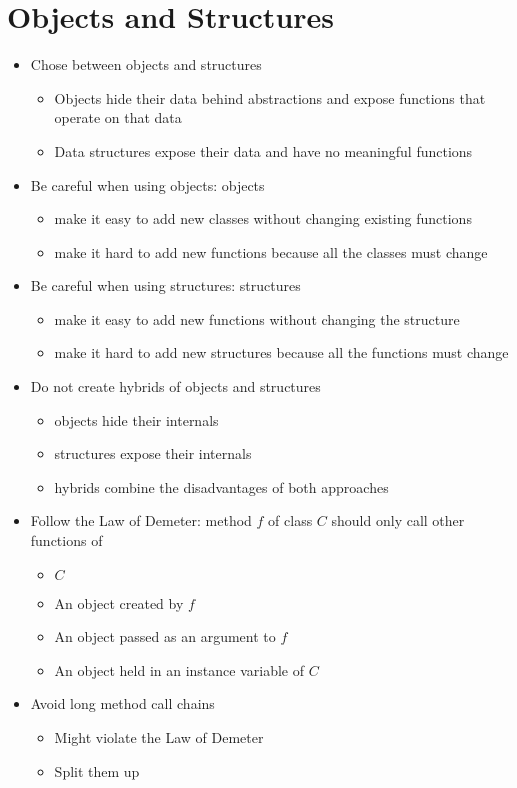 
\section*{Objects and Structures}
\begin{itemize}
    \item Chose between objects and structures
    \begin{itemize}
        \item Objects hide their data behind abstractions and expose functions that operate on that data
        \item Data structures expose their data and have no meaningful functions
    \end{itemize}
    \item Be careful when using objects: objects
    \begin{itemize}
        \item make it easy to add new classes without changing existing functions
        \item make it hard to add new functions because all the classes must change
    \end{itemize}
    \item Be careful when using structures: structures
    \begin{itemize}
        \item make it easy to add new functions without changing the structure
        \item make it hard to add new structures because all the functions must change
    \end{itemize}
    \item Do not create hybrids of objects and structures
    \begin{itemize}
        \item objects hide their internals
        \item structures expose their internals
        \item hybrids combine the disadvantages of both approaches
    \end{itemize}
    \item Follow the Law of Demeter: method $f$ of class $C$ should only call other functions of
    \begin{itemize}
        \item $C$
        \item An object created by $f$
        \item An object passed as an argument to $f$
        \item An object held in an instance variable of $C$
    \end{itemize}
    \item Avoid long method call chains
    \begin{itemize}
        \item Might violate the Law of Demeter
        \item Split them up
    \end{itemize}
\end{itemize}